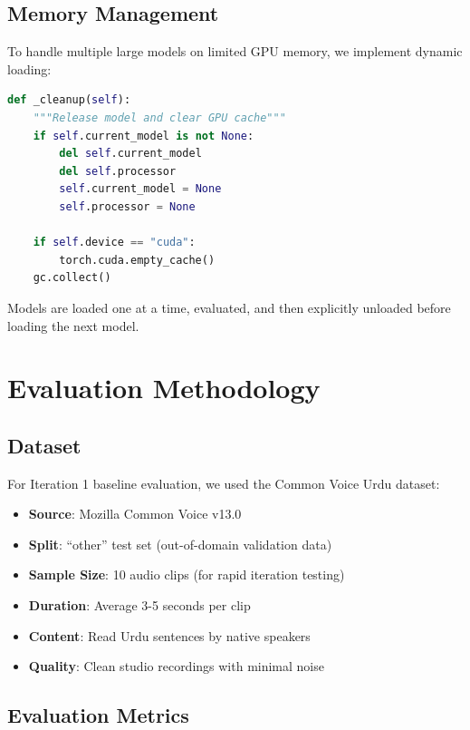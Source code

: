 \subsection{Memory Management}

To handle multiple large models on limited GPU memory, we implement dynamic loading:

\begin{lstlisting}[language=Python, caption=Memory Management]
def _cleanup(self):
    """Release model and clear GPU cache"""
    if self.current_model is not None:
        del self.current_model
        del self.processor
        self.current_model = None
        self.processor = None
    
    if self.device == "cuda":
        torch.cuda.empty_cache()
    gc.collect()
\end{lstlisting}

Models are loaded one at a time, evaluated, and then explicitly unloaded before loading the next model.

\section{Evaluation Methodology}

\subsection{Dataset}

For Iteration 1 baseline evaluation, we used the Common Voice Urdu dataset:

\begin{itemize}
    \item \textbf{Source}: Mozilla Common Voice v13.0
    \item \textbf{Split}: ``other'' test set (out-of-domain validation data)
    \item \textbf{Sample Size}: 10 audio clips (for rapid iteration testing)
    \item \textbf{Duration}: Average 3-5 seconds per clip
    \item \textbf{Content}: Read Urdu sentences by native speakers
    \item \textbf{Quality}: Clean studio recordings with minimal noise
\end{itemize}

\subsection{Evaluation Metrics}

